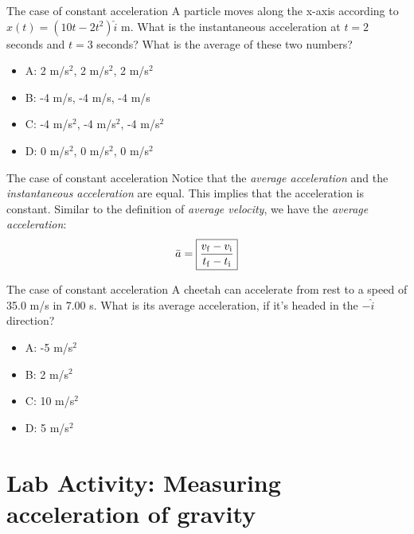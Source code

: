 \documentclass{beamer}
\begin{document}
\begin{frame}{The case of constant acceleration}
A particle moves along the x-axis according to $x(t) = (10t-2t^2)\hat{i}$ m.  What is the instantaneous acceleration
at $t=2$ seconds and $t=3$ seconds? What is the average of these two numbers?
\begin{itemize}
\item A: 2 m/s$^2$, 2 m/s$^2$, 2 m/s$^2$
\item B: -4 m/s, -4 m/s, -4 m/s
\item C: -4 m/s$^2$, -4 m/s$^2$, -4 m/s$^2$
\item D: 0 m/s$^2$, 0 m/s$^2$, 0 m/s$^2$
\end{itemize}
\end{frame}

\begin{frame}{The case of constant acceleration}
Notice that the \textit{average acceleration} and the \textit{instantaneous acceleration} are equal.  This implies that the acceleration is constant.  Similar to the definition of \textit{average velocity}, we have the \textit{average acceleration}:\\
\begin{equation}
\bar{a} = \boxed{\frac{v_{\rm f} - v_{\rm i}}{t_{\rm f} - t_{\rm i}}}
\end{equation}
\end{frame}

\begin{frame}{The case of constant acceleration}
A cheetah can accelerate from rest to a speed of 35.0 m/s in 7.00 s. What is its average acceleration, if it's headed in the $-\hat{i}$ direction?
\begin{itemize}
\item A: -5 m/s$^2$
\item B: 2 m/s$^2$
\item C: 10 m/s$^2$
\item D: 5 m/s$^2$
\end{itemize}
\end{frame}

\section{Lab Activity: Measuring acceleration of gravity}
\end{document}
